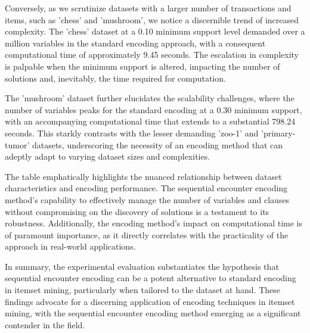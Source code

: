 Conversely, as we scrutinize datasets with a larger number of transactions and items,
such as 'chess' and 'mushroom', we notice a discernible trend of increased complexity.
The 'chess' dataset at a 0.10 minimum support level demanded over a million variables in the standard encoding approach,
with a consequent computational time of approximately 9.45 seconds.
The escalation in complexity is palpable when the minimum support is altered,
impacting the number of solutions and, inevitably, the time required for computation.

The 'mushroom' dataset further elucidates the scalability challenges,
where the number of variables peaks for the standard encoding at a 0.30 minimum support,
with an accompanying computational time that extends to a substantial 798.24 seconds.
This starkly contrasts with the lesser demanding 'zoo-1' and 'primary-tumor' datasets,
underscoring the necessity of an encoding method that can adeptly adapt to varying dataset sizes and complexities.

The table emphatically highlights the nuanced relationship between dataset characteristics and
encoding performance. The sequential encounter encoding method's capability to
effectively manage the number of variables and clauses without compromising
on the discovery of solutions is a testament to its robustness.
Additionally, the encoding method's impact on computational time is of paramount importance,
as it directly correlates with the practicality of the approach in real-world applications.

In summary, the experimental evaluation substantiates the hypothesis that sequential encounter encoding can be a potent alternative to standard encoding in itemset mining,
particularly when tailored to the dataset at hand. These findings advocate for a discerning application of encoding techniques in itemset mining, with the sequential encounter
encoding method emerging as a significant contender in the field.